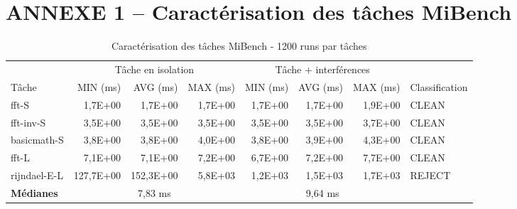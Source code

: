 \cleardoublepage


\section*{ANNEXE 1 -- Caractérisation des tâches MiBench} \label{Annexe1}
\setcounter{chapter}{0}  %
\setcounter{table}{0}
\renewcommand{\thetable}{A\arabic{table}} %
 \begin{table}[ht!]
	\centering
	\caption{Caractérisation des tâches MiBench - 1200 runs par tâches} 	\label{tab:Phase1-2-results}
	\begin{adjustwidth}{-40pt}{0pt}
		\begin{tabular}{@{}lrrrrrrl@{}}
			\toprule
			         & \multicolumn{3}{c}{Tâche en isolation}  & \multicolumn{3}{c}{Tâche + interférences} &  \\
			\cmidrule(lr){2-4} \cmidrule(lr){5-7}
			Tâche	 & MIN (ms)  & AVG (ms)  & MAX (ms)  & MIN (ms)  & AVG (ms)  & MAX (ms)  & Classification     \\
			\midrule
			fft-S               & 1,7E+00   & 1,7E+00   & 1,7E+00   & 1,7E+00   & 1,7E+00   & 1,9E+00   & CLEAN    \\
			fft-inv-S           & 3,5E+00   & 3,5E+00   & 3,5E+00   & 3,5E+00   & 3,5E+00   & 3,7E+00   & CLEAN    \\
			basicmath-S         & 3,8E+00   & 3,8E+00   & 4,0E+00   & 3,8E+00   & 3,9E+00   & 4,3E+00   & CLEAN    \\
			fft-L               & 7,1E+00   & 7,1E+00   & 7,2E+00   & 6,7E+00   & 7,2E+00   & 7,7E+00   & CLEAN    \\
			rijndael-E-L        & 127,7E+00 & 152,3E+00 & 5,8E+03   & 1,2E+03   & 1,5E+03   & 1,7E+03   & REJECT   \\
			\midrule
			\textbf{Médianes} 	& \multicolumn{3}{c}{7,83 ms}	& \multicolumn{3}{c}{9,64 ms}	& 	\\
			\bottomrule
		\end{tabular}
	\end{adjustwidth}
\end{table}

\restoregeometry
